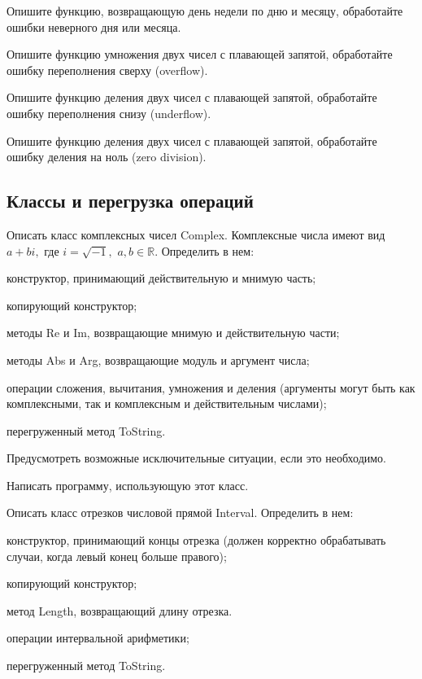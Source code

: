 \task 

\task Опишите функцию, возвращающую день недели по дню и месяцу, обработайте ошибки неверного дня или месяца.

\task Опишите функцию умножения двух чисел с плавающей запятой, обработайте ошибку переполнения сверху (overflow).

\task Опишите функцию деления двух чисел с плавающей запятой, обработайте ошибку переполнения снизу (underflow).

\task Опишите функцию деления двух чисел с плавающей запятой, обработайте ошибку деления на ноль (zero division).


\subsection{Классы и перегрузка операций}

\task Описать класс комплексных чисел Complex. Комплексные числа имеют
вид $a+bi,$ где $i=\sqrt{-1},$ $a,b \in \mathbb{R}$. Определить в нем:
\begin{itemize*}
\item конструктор, принимающий действительную и мнимую часть;
\item копирующий конструктор;
\item методы Re и Im, возвращающие мнимую и действительную части;
\item методы Abs и Arg, возвращающие модуль и аргумент числа;
\item операции сложения, вычитания, умножения и деления (аргументы
  могут быть как комплексными, так и комплексным и действительным
  числами);
\item перегруженный метод ToString.
\end{itemize*}

Предусмотреть возможные исключительные ситуации, если это необходимо.

Написать программу, использующую этот класс.

\task Описать класс отрезков числовой прямой Interval. Определить в нем:
\begin{itemize*}
\item конструктор, принимающий концы отрезка (должен корректно
  обрабатывать случаи, когда левый конец больше правого);
\item копирующий конструктор;
\item метод Length, возвращающий длину отрезка.
\item операции интервальной арифметики;
\item перегруженный метод ToString.
\end{itemize*}

